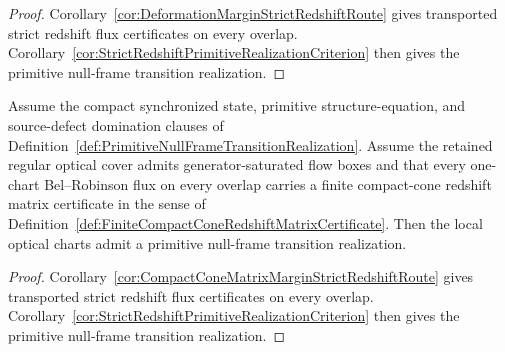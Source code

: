 \begin{proof}
Corollary~\ref{cor:DeformationMarginStrictRedshiftRoute} gives transported strict redshift flux certificates on every overlap.  Corollary~\ref{cor:StrictRedshiftPrimitiveRealizationCriterion} then gives the primitive null-frame transition realization.
\end{proof}

\begin{corollary}\label{cor:CompactConeMatrixMarginPrimitiveRealizationCriterion}
Assume the compact synchronized state, primitive structure-equation, and
source-defect domination clauses of
Definition~\ref{def:PrimitiveNullFrameTransitionRealization}.  Assume the
retained regular optical cover admits generator-saturated flow boxes and that
every one-chart Bel--Robinson flux on every overlap carries a finite compact-cone
redshift matrix certificate in the sense of
Definition~\ref{def:FiniteCompactConeRedshiftMatrixCertificate}.  Then the local
optical charts admit a primitive null-frame transition realization.
\end{corollary}

\begin{proof}
Corollary~\ref{cor:CompactConeMatrixMarginStrictRedshiftRoute} gives transported
strict redshift flux certificates on every overlap.  Corollary~\ref{cor:StrictRedshiftPrimitiveRealizationCriterion}
then gives the primitive null-frame transition realization.
\end{proof}

